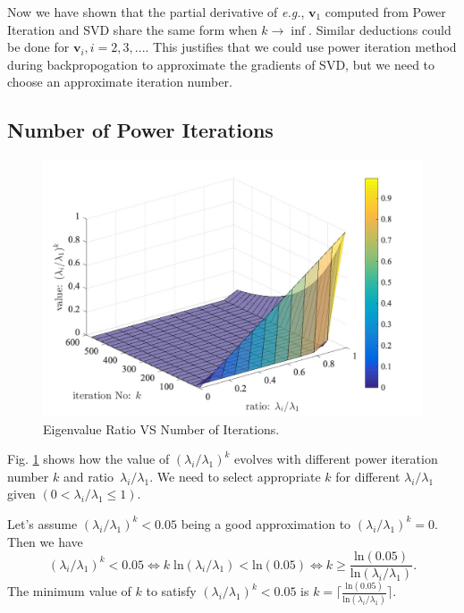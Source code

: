 \documentclass{article}
\newcommand{\bv}{\mathbf{v}}
\begin{document}
Now we have shown that the partial derivative of \emph{e.g.}, $\bv_1$ computed from Power Iteration and SVD share the same form when $k\rightarrow \inf$.
Similar deductions could be done for  $\bv_i, i=2,3,...$.
This justifies that we could use power iteration method during backpropogation to approximate the gradients of SVD, but we need to choose an approximate iteration number.

\subsection{Number of Power Iterations}

\begin{figure}[!htb]
\begin{center}
\includegraphics[width=0.7\linewidth]{curve.pdf}
\end{center}
\caption{Eigenvalue Ratio VS Number of Iterations.}
\label{fig: curve}
\end{figure}

Fig. \ref{fig: curve} shows how the value of $(\lambda_i/\lambda_1)^k$ evolves with different power iteration number $k$ and ratio~$\lambda_i/\lambda_1$. We need to select appropriate $k$ for different $\lambda_i/\lambda_1$ given $(0 < \lambda_i/\lambda_1 \leq 1)$. 

Let's assume $(\lambda_i/\lambda_1)^k<0.05$ being a good approximation to $(\lambda_i/\lambda_1)^k=0$. Then we have
\begin{equation}
(\lambda_i/\lambda_1)^k<0.05 \Leftrightarrow k\; \text{ln}(\lambda_i/\lambda_1) < \text{ln}(0.05) \Leftrightarrow k \geq \frac{\text{ln}(0.05)}{\text{ln}(\lambda_i/\lambda_1)}.
\end{equation}
The minimum value of $k$ to satisfy $(\lambda_i/\lambda_1)^k<0.05$ is $k = \lceil \frac{\text{ln}(0.05)}{\text{ln}(\lambda_i/\lambda_1)} \rceil$.
\end{document}
